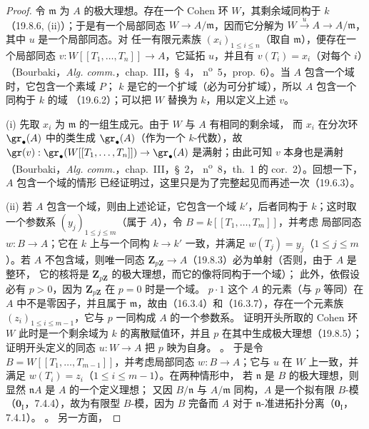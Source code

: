 \begin{proof}
令 $\mathfrak m$ 为 $A$ 的极大理想。存在一个 Cohen 环 $W$，其剩余域同构于 $k$
（19.8.6, (ii)）；于是有一个局部同态 $W\to A/\mathfrak m$，因而它分解为
$W\xrightarrow{u}A\to A/\mathfrak m$，其中 $u$ 是一个局部同态。对
任一有限元素族 $(x_i)_{1\leq i\leq n}$（取自 $\mathfrak m$），便存在一个局部同态
$v:W[[T_1,\ldots,T_n]]\to A$，它延拓 $u$，并且有
$v(T_i)=x_i$（对每个 $i$）（Bourbaki，\emph{Alg. comm.}，chap.~III，§~4，
n\textsuperscript{o}~5，prop.~6）。当 $A$ 包含一个域时，它包含一个素域 $P$；
$k$ 是它的一个扩域（必为可分扩域），所以 $A$ 包含一个同构于 $k$ 的域
（19.6.2）；可以把 $W$ 替换为 $k$，用以定义上述 $v$。

\medskip
\noindent(i)\enspace
先取 $x_i$ 为 $\mathfrak m$ 的一组生成元。由于 $W$ 与 $A$ 有相同的剩余域，
而 $x_i$ 在分次环 $\gr_\bullet(A)$ 中的类生成 $\gr_\bullet(A)$（作为一个
$k$-代数），故
$\gr(v):\gr_\bullet(W[[T_1,\ldots,T_n]])\to\gr_\bullet(A)$ 是满射；由此可知
$v$ 本身也是满射（Bourbaki，\emph{Alg. comm.}，chap.~III，§~2，
n\textsuperscript{o}~8，th.~1 的 cor.~2）。回想一下，$A$ 包含一个域的情形
已经证明过，这里只是为了完整起见而再述一次（19.6.3）。

\medskip
\noindent(ii)\enspace
若 $A$ 包含一个域，则由上述论证，它包含一个域 $k'$，后者同构于 $k$；这时取
一个参数系 $(y_j)_{1\leq j\leq m}$（属于 $A$），令 $B=k[[T_1,\ldots,T_m]]$，并考虑
局部同态 $w:B\to A$；它在 $k$ 上与一个同构 $k\to k'$ 一致，并满足
$w(T_j)=y_j$（$1\leq j\leq m$）。若 $A$ 不包含域，则唯一同态
$\mathbf Z_{p\mathbf Z}\to A$（19.8.3）必为单射（否则，由于 $A$ 是整环，
它的核将是 $\mathbf Z_{p\mathbf Z}$ 的极大理想，而它的像将同构于一个域）；
此外，依假设必有 $p>0$，因为 $\mathbf Z_{p\mathbf Z}$ 在 $p=0$ 时是一个域。
$p\cdot1$ 这个 $A$ 的元素（与 $p$ 等同）在 $A$ 中不是零因子，并且属于
$\mathfrak m$，故由（16.3.4）和（16.3.7），存在一个元素族
$(z_i)_{1\leq i\leq m-1}$，它与 $p$ 一同构成 $A$ 的一个参数系。
证明开头所取的 Cohen 环 $W$ 此时是一个剩余域为 $k$ 的离散赋值环，并且 $p$
在其中生成极大理想（19.8.5）；证明开头定义的同态 $u:W\to A$ 把 $p$ 映为自身。
。
于是令 $B=W[[T_1,\ldots,T_{m-1}]]$，并考虑局部同态 $w:B\to A$；它与 $u$
在 $W$ 上一致，并满足 $w(T_i)=z_i$（$1\leq i\leq m-1$）。在两种情形中，
若 $\mathfrak n$ 是 $B$ 的极大理想，则显然 $\mathfrak nA$ 是 $A$ 的一个定义理想；
又因 $B/\mathfrak n$ 与 $A/\mathfrak m$ 同构，$A$ 是一个拟有限 $B$-模
（$\mathbf 0_{\mathrm I}$，7.4.4），故为有限型 $B$-模，因为 $B$ 完备而 $A$ 对于
$\mathfrak n$-准进拓扑分离（$\mathbf 0_{\mathrm I}$，7.4.1）。
。
另一方面，


\end{proof}
